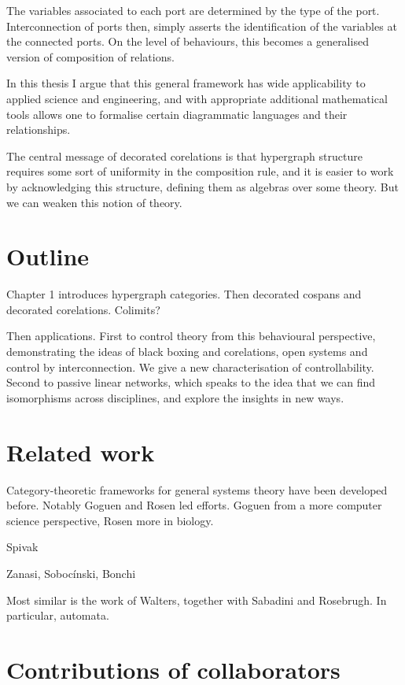 
The variables associated to each port are determined by the type of the port.
Interconnection of ports then, simply asserts the identification of the
variables at the connected ports. On the level of behaviours, this becomes a
generalised version of composition of relations.

In this thesis I argue that this general framework has wide applicability to
applied science and engineering, and with appropriate additional mathematical
tools allows one to formalise certain diagrammatic languages and their
relationships.

The central message of decorated corelations is that hypergraph structure
requires some sort of uniformity in the composition rule, and it is easier to
work by acknowledging this structure, defining them as algebras over some
theory. But we can weaken this notion of theory.

\section{Outline}
Chapter 1 introduces hypergraph categories. Then decorated cospans and decorated
corelations. Colimits?

Then applications. First to control theory from this behavioural perspective,
demonstrating the ideas of black boxing and corelations, open systems and
control by interconnection. We give a new characterisation of controllability.
Second to passive linear networks, which speaks to the idea that we can find
isomorphisms across disciplines, and explore the insights in new ways.

\section{Related work}

Category-theoretic frameworks for general systems theory have been developed
before. Notably Goguen and Rosen led efforts. Goguen from a more computer
science perspective, Rosen more in biology.



Spivak 

Zanasi, Soboc\'inski, Bonchi

Most similar is the work of Walters, together with Sabadini and Rosebrugh. In
particular, automata.

\section{Contributions of collaborators}

